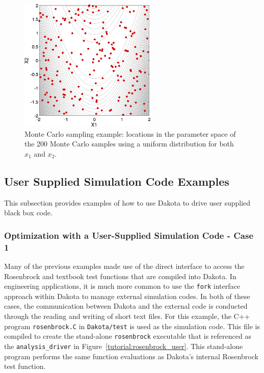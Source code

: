 \begin{figure}[ht!]
  \centering
  \includegraphics[height=2.5in]{images/rosen_nond_pts}
  \caption{Monte Carlo sampling example: locations in the parameter
    space of the 200 Monte Carlo samples using a uniform distribution
    for both $x_1$ and $x_2$.}
  \label{tutorial:rosenbrock_mc_points}
\end{figure}

\subsection{User Supplied Simulation Code Examples}\label{tutorial:examples:user_supply}
This subsection provides examples of how to use Dakota to drive user 
supplied black box code.

\subsubsection{Optimization with a User-Supplied Simulation Code - Case 1}\label{tutorial:examples:user_supply:optimization1}

Many of the previous examples made use of the direct interface to
access the Rosenbrock and textbook test functions that are compiled
into Dakota. In engineering applications, it is much more common to
use the \texttt{fork} interface approach within
Dakota to manage external simulation codes. In both of these cases,
the communication between Dakota and the external code is conducted
through the reading and writing of short text files. For this example,
the C++ program \texttt{rosenbrock.C} in \texttt{Dakota/test} is used
as the simulation code. This file is compiled to create the
stand-alone \texttt{rosenbrock} executable that is referenced as the
\texttt{analysis\_driver} in Figure~\ref{tutorial:rosenbrock_user}.
This stand-alone program performs the same function evaluations as
Dakota's internal Rosenbrock test function.

